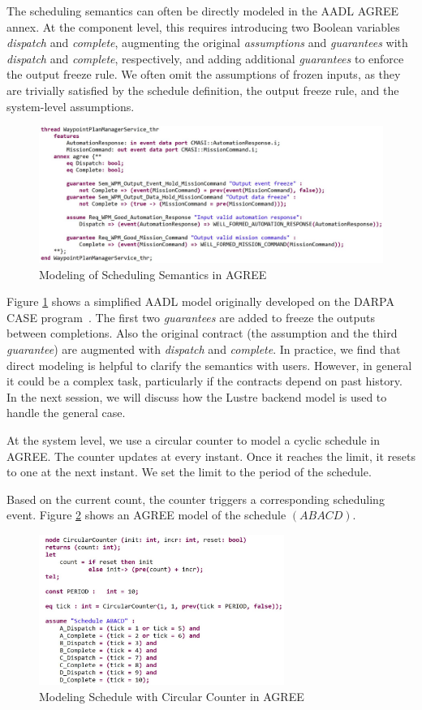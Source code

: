 The scheduling semantics can often be directly modeled in the AADL AGREE annex. At the component level, this requires introducing two Boolean variables \emph{dispatch} and \emph{complete}, augmenting the original \emph{assumptions} and \emph{guarantees} with \emph{dispatch} and \emph{complete}, respectively, and adding additional \emph{guarantees} to enforce the output freeze rule. We often omit the assumptions of frozen inputs, as they are trivially satisfied by the schedule definition, the output freeze rule, and the system-level assumptions.

\begin{figure}[t!]
\centering
\includegraphics[width=130mm]{wpmAGREE3.jpg}
\caption{Modeling of Scheduling Semantics in AGREE\label{wpmAGREE}}
\end{figure}

Figure \ref{wpmAGREE} shows a simplified AADL model originally developed on the DARPA CASE program~\cite{MODELS}. The first two \emph{guarantees} are added to freeze the outputs between completions. Also the original contract (the assumption and the third \emph{guarantee}) are augmented with \emph{dispatch} and \emph{complete}.
In practice, we find that direct modeling is helpful to clarify the semantics with users. However, in general it could be a complex task, particularly if the contracts depend on past history. In the next session, we will discuss how the Lustre backend model is used to handle the general case.

At the system level, we use a circular counter to model a cyclic schedule in AGREE. 
The counter updates at every instant. Once it reaches the limit, it resets to one at the next instant.
We set the limit to the period of the schedule. 

Based on the current count, the counter triggers a corresponding scheduling event.
Figure \ref{schedule} shows an AGREE model of the schedule $(ABACD)$.

\begin{figure}[t!]
\centering
\includegraphics[width=80mm]{schedule.jpg}
\caption{Modeling Schedule with Circular Counter in AGREE\label{schedule}}
\end{figure}

